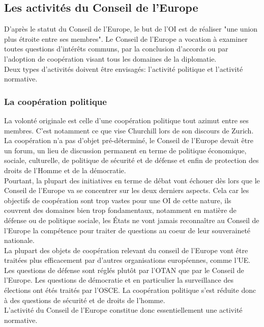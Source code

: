 \documentclass[10pt, a4paper, openany]{book}
\begin{document}
\subsection{Les activités du Conseil de l'Europe}

D'après le statut du Conseil de l'Europe, le but de l'OI est de réaliser "une union plus étroite entre ses membres". Le Conseil de l'Europe a vocation à examiner toutes questions d'intérêts communs, par la conclusion d'accords ou par l'adoption de coopération visant tous les domaines de la diplomatie. \\
Deux types d'activités doivent être envisagés: l'activité politique et l'activité normative.

\subsubsection{La coopération politique}

La volonté originale est celle d'une coopération politique tout azimut entre ses membres. C'est notamment ce que vise Churchill lors de son discours de Zurich. La coopération n'a pas d'objet pré-déterminé, le Conseil de l'Europe devait être un forum, un lieu de discussion permanent en terme de politique économique, sociale, culturelle, de politique de sécurité et de défense et enfin de protection des droits de l'Homme et de la démocratie. \\
Pourtant, la plupart des initiatives en terme de débat vont échouer dès lors que le Conseil de l'Europe va se concentrer sur les deux derniers aspects. Cela car les objectifs de coopération sont trop vastes pour une OI de cette nature, ils couvrent des domaines bien trop fondamentaux, notamment en matière de défense ou de politique sociale, les États ne vont jamais reconnaître au Conseil de l'Europe la compétence pour traiter de questions au coeur de leur souveraineté nationale. \\
La plupart des objets de coopération relevant du conseil de l'Europe vont être traitées plus efficacement par d'autres organisations européennes, comme l'UE. Les questions de défense sont réglés plutôt par l'OTAN que par le Conseil de l'Europe. Les questions de démocratie et en particulier la surveillance des élections ont étés traités par l'OSCE. La coopération politique s'est réduite donc à des questions de sécurité et de droits de l'homme. \\
L'activité du Conseil de l'Europe constitue donc essentiellement une activité normative.
\end{document}
